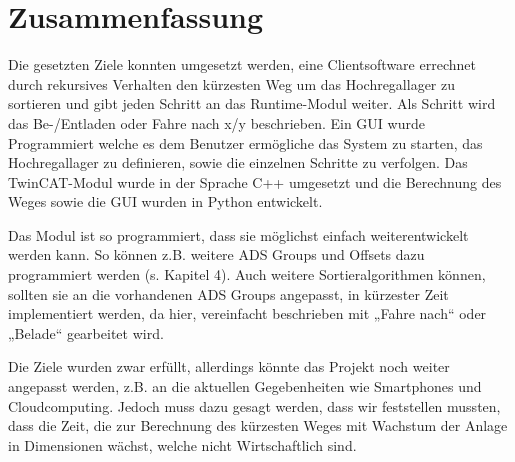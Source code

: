 \documentclass{fh-ium-bama}
\begin{document}
\newpage
\chapter{Zusammenfassung}
Die gesetzten Ziele konnten umgesetzt werden, eine Clientsoftware errechnet durch rekursives Verhalten den kürzesten Weg um das Hochregallager zu sortieren und gibt jeden Schritt an das Runtime-Modul weiter. Als Schritt wird das Be-/Entladen oder Fahre nach x/y beschrieben. Ein GUI wurde Programmiert welche es dem Benutzer ermögliche das System zu starten, das Hochregallager zu definieren, sowie die einzelnen Schritte zu verfolgen. Das TwinCAT-Modul wurde in der Sprache C++ umgesetzt und die Berechnung des Weges sowie die GUI wurden in Python entwickelt.

Das Modul ist so programmiert, dass sie möglichst einfach weiterentwickelt werden kann. So können z.B. weitere ADS Groups und Offsets dazu programmiert werden (s. Kapitel 4). Auch weitere Sortieralgorithmen können, sollten sie an die vorhandenen ADS Groups angepasst, in kürzester Zeit implementiert werden, da hier, vereinfacht beschrieben mit „Fahre nach“ oder „Belade“ gearbeitet wird.

Die Ziele wurden zwar erfüllt, allerdings könnte das Projekt noch weiter angepasst werden, z.B. an die aktuellen Gegebenheiten wie Smartphones und Cloudcomputing. Jedoch muss dazu gesagt werden, dass wir feststellen mussten, dass die Zeit, die zur Berechnung des kürzesten Weges mit Wachstum der Anlage in Dimensionen wächst, welche nicht Wirtschaftlich sind.

\backmatter
\end{document}
